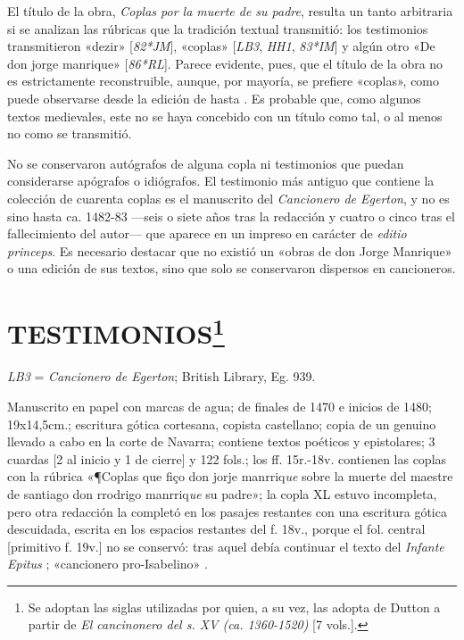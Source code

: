 \documentclass[11pt,a4paper,twoside]{article}
\newcommand{\comillas}[1]{«#1»}
\begin{document}
El título de la obra, \textit{Coplas por la muerte de su padre}, resulta un tanto arbitraria si se analizan las rúbricas que la tradición textual transmitió: los testimonios transmitieron \comillas{dezir} [\textit{82*JM}], \comillas{coplas} [\textit{LB3}, \textit{HH1}, \textit{83*IM}] y algún otro \comillas{De don jorge manrique} [\textit{86*RL}]. Parece evidente, pues, que el título de la obra no es estrictamente reconstruible, aunque, por mayoría, se prefiere \comillas{coplas}, como puede observarse desde la edición de \textcite{Foulché-Delbosc1902} hasta \textcite{Beltrán2013}. Es probable que, como algunos textos medievales, este no se haya concebido con un título como tal, o al menos no como se transmitió.

No se conservaron autógrafos de alguna copla ni testimonios que puedan considerarse apógrafos o idiógrafos. El testimonio más antiguo que contiene la colección de cuarenta coplas es el manuscrito del \textit{Cancionero de Egerton}, y no es sino hasta ca. 1482-83 —seis o siete años tras la redacción y cuatro o cinco tras el fallecimiento del autor— que aparece en un impreso en carácter de \textit{editio princeps}. Es necesario destacar que no existió un \comillas{obras de don Jorge Manrique} o una edición de sus textos, sino que solo se conservaron dispersos en cancioneros.

\section*{\fontsize{13}{14.35}\selectfont TESTIMONIOS\footnote{Se adoptan las siglas utilizadas por \textcite{PérezPriego2017} quien, a su vez, las adopta de Dutton a partir de \textit{El cancinonero del s. XV (ca. 1360-1520)} [7 vols.].}}

\textit{LB3} = \textit{Cancionero de Egerton}; British Library, Eg. 939.

Manuscrito en papel con marcas de agua; de finales de 1470 e inicios de 1480; 19x14,5cm.; escritura gótica cortesana, copista castellano; copia de un genuino llevado a cabo en la corte de Navarra; contiene textos poéticos y epistolares; 3 cuardas [2 al inicio y 1 de cierre] y 122 fols.; los ff. 15r.-18v. contienen las coplas con la rúbrica \comillas{¶Coplas que fiço don jorje manrriq\textit{ue} sobre la muerte del maestre de santiago don rrodrigo manrriq\textit{ue} su padre}; la copla XL estuvo incompleta, pero otra redacción la completó en los pasajes restantes con una escritura gótica descuidada, escrita en los espacios restantes del f. 18v., porque el fol. central [primitivo f. 19v.] no se conservó: tras aquel debía continuar el texto del \textit{Infante Epitus} \textcite{Beltrán2011}; \comillas{cancionero pro-Isabelino} \parencite{Severin2000}.\vspace{5pt}
\end{document}
